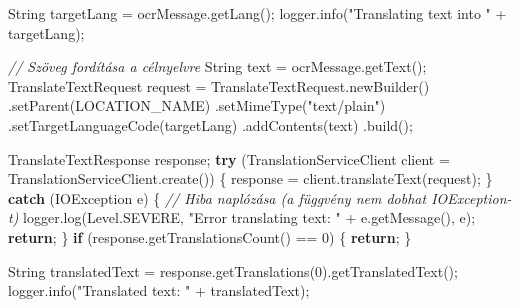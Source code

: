 \documentclass[
]{article}
\newenvironment{Shaded}{}{}
\newcommand{\BuiltInTok}[1]{\textcolor[rgb]{0.00,0.50,0.00}{#1}}
\newcommand{\CommentTok}[1]{\textcolor[rgb]{0.38,0.63,0.69}{\textit{#1}}}
\newcommand{\ControlFlowTok}[1]{\textcolor[rgb]{0.00,0.44,0.13}{\textbf{#1}}}
\newcommand{\DecValTok}[1]{\textcolor[rgb]{0.25,0.63,0.44}{#1}}
\newcommand{\FunctionTok}[1]{\textcolor[rgb]{0.02,0.16,0.49}{#1}}
\newcommand{\NormalTok}[1]{#1}
\newcommand{\OperatorTok}[1]{\textcolor[rgb]{0.40,0.40,0.40}{#1}}
\newcommand{\StringTok}[1]{\textcolor[rgb]{0.25,0.44,0.63}{#1}}
\begin{document}
\begin{Shaded}
\begin{Highlighting}[]
    \BuiltInTok{String}\NormalTok{ targetLang }\OperatorTok{=}\NormalTok{ ocrMessage}\OperatorTok{.}\FunctionTok{getLang}\OperatorTok{();}
\NormalTok{    logger}\OperatorTok{.}\FunctionTok{info}\OperatorTok{(}\StringTok{"Translating text into "} \OperatorTok{+}\NormalTok{ targetLang}\OperatorTok{);}

    \CommentTok{// Szöveg fordítása a célnyelvre}
    \BuiltInTok{String}\NormalTok{ text }\OperatorTok{=}\NormalTok{ ocrMessage}\OperatorTok{.}\FunctionTok{getText}\OperatorTok{();}
\NormalTok{    TranslateTextRequest request }\OperatorTok{=}
\NormalTok{        TranslateTextRequest}\OperatorTok{.}\FunctionTok{newBuilder}\OperatorTok{()}
            \OperatorTok{.}\FunctionTok{setParent}\OperatorTok{(}\NormalTok{LOCATION\_NAME}\OperatorTok{)}
            \OperatorTok{.}\FunctionTok{setMimeType}\OperatorTok{(}\StringTok{"text/plain"}\OperatorTok{)}
            \OperatorTok{.}\FunctionTok{setTargetLanguageCode}\OperatorTok{(}\NormalTok{targetLang}\OperatorTok{)}
            \OperatorTok{.}\FunctionTok{addContents}\OperatorTok{(}\NormalTok{text}\OperatorTok{)}
            \OperatorTok{.}\FunctionTok{build}\OperatorTok{();}

\NormalTok{    TranslateTextResponse response}\OperatorTok{;}
    \ControlFlowTok{try} \OperatorTok{(}\NormalTok{TranslationServiceClient client }\OperatorTok{=}\NormalTok{ TranslationServiceClient}\OperatorTok{.}\FunctionTok{create}\OperatorTok{())} \OperatorTok{\{}
\NormalTok{      response }\OperatorTok{=}\NormalTok{ client}\OperatorTok{.}\FunctionTok{translateText}\OperatorTok{(}\NormalTok{request}\OperatorTok{);}
    \OperatorTok{\}} \ControlFlowTok{catch} \OperatorTok{(}\BuiltInTok{IOException}\NormalTok{ e}\OperatorTok{)} \OperatorTok{\{}
      \CommentTok{// Hiba naplózása (a függvény nem dobhat IOException{-}t)}
\NormalTok{      logger}\OperatorTok{.}\FunctionTok{log}\OperatorTok{(}\BuiltInTok{Level}\OperatorTok{.}\FunctionTok{SEVERE}\OperatorTok{,} \StringTok{"Error translating text: "} \OperatorTok{+}\NormalTok{ e}\OperatorTok{.}\FunctionTok{getMessage}\OperatorTok{(),}\NormalTok{ e}\OperatorTok{);}
      \ControlFlowTok{return}\OperatorTok{;}
    \OperatorTok{\}}
    \ControlFlowTok{if} \OperatorTok{(}\NormalTok{response}\OperatorTok{.}\FunctionTok{getTranslationsCount}\OperatorTok{()} \OperatorTok{==} \DecValTok{0}\OperatorTok{)} \OperatorTok{\{}
      \ControlFlowTok{return}\OperatorTok{;}
    \OperatorTok{\}}

    \BuiltInTok{String}\NormalTok{ translatedText }\OperatorTok{=}\NormalTok{ response}\OperatorTok{.}\FunctionTok{getTranslations}\OperatorTok{(}\DecValTok{0}\OperatorTok{).}\FunctionTok{getTranslatedText}\OperatorTok{();}
\NormalTok{    logger}\OperatorTok{.}\FunctionTok{info}\OperatorTok{(}\StringTok{"Translated text: "} \OperatorTok{+}\NormalTok{ translatedText}\OperatorTok{);}


\end{Highlighting}
\end{Shaded}
\end{document}
